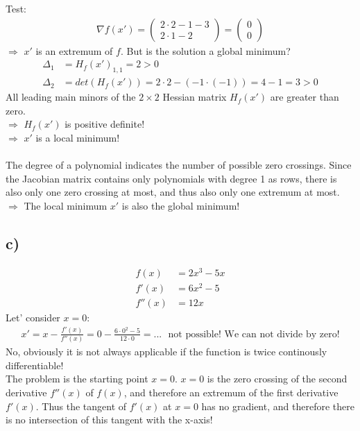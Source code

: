 \documentclass[a4paper]{article}
\begin{document}
        Test:
        \begin{align}
            \nabla f(x') = \left( \begin{matrix} 2 \cdot 2 - 1 - 3 \\ 2 \cdot 1 -2 \end{matrix} \right) = \left( \begin{matrix} 0 \\ 0 \end{matrix} \right)
        \end{align}
        $\Rightarrow$ $x'$ is an extremum of $f$.
        But is the solution a global minimum?
        \begin{align}
            \Delta_1 &= H_f(x')_{1,1} = 2 > 0\\
            \Delta_2 &= det(H_f(x')) = 2 \cdot 2 - (-1 \cdot (-1)) = 4-1 = 3 > 0
        \end{align}
        All leading main minors of the $2 \times 2$ Hessian matrix $H_f(x')$ are greater than zero.\\
        $\Rightarrow$ $H_f(x')$ is positive definite!\\
        $\Rightarrow$ $x'$ is a local minimum!\\\\
        The degree of a polynomial indicates the number of possible zero crossings.
        Since the Jacobian matrix contains only polynomials with degree 1 as rows, there is also only one zero crossing at most, and thus also only one extremum at most.\\
        $\Rightarrow$ The local minimum $x'$ is also the global minimum!
        
    \subsection*{c)}
        \begin{align}
            f(x) &= 2x^3 -5x\\
            f'(x) &= 6x^2 -5\\
            f''(x) &= 12x
        \end{align}
        Let' consider $x=0$:
        \begin{align}
            x' = x - \frac{f'(x)}{f''(x)} = 0 - \frac{6 \cdot 0^2 -5}{12 \cdot 0} = ...\ \ \  \text{not possible! We can not divide by zero!}
        \end{align}
        No, obviously it is not always applicable if the function is twice continously differentiable!\\
        The problem is the starting point $x=0$.
        $x=0$ is the zero crossing of the second derivative $f''(x)$ of $f(x)$, and therefore an extremum of the first derivative $f'(x)$.
        Thus the tangent of $f'(x)$ at $x=0$ has no gradient, and therefore there is no intersection of this tangent with the x-axis!
        
\end{document}
